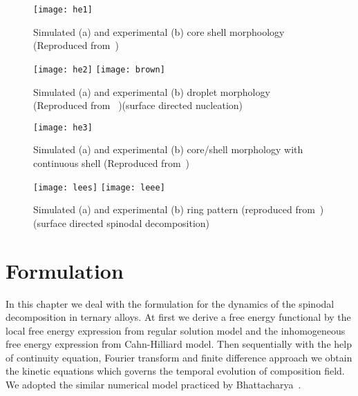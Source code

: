 \documentclass[12pt]{iiscthes}
\theoremstyle{definition}
\theoremstyle{definition}
\theoremstyle{remark}
\begin{document}
\begin{figure}[H]
\begin{center}
\texttt{[image: he1]}
\caption[Simulated (a) and experimental (b) core shell morphoology]{Simulated (a) and experimental (b) core shell morphoology (Reproduced from~\cite{RNauman})}\label{he1}
\end{center}
\end{figure}
\begin{figure}[H]
\begin{center}
\texttt{[image: he2]}
\texttt{[image: brown]}
\caption[Simulated (a) and experimental (b) droplet morphology]{Simulated (a) and experimental (b) droplet morphology (Reproduced from ~\cite{RNauman,Chakrabarti})(surface directed nucleation)}\label{he2}
\end{center}
\end{figure}
\begin{figure}[H]
\begin{center}
\texttt{[image: he3]}
\caption[Simulated (a) and experimental (b) core/shell morphology with continuous shell]{Simulated (a) and experimental (b) core/shell morphology with continuous shell (Reproduced from~\cite{RNauman})}\label{he2}
\end{center}
\end{figure}
\begin{figure}[H]
\begin{center}
\texttt{[image: lees]}
\texttt{[image: leee]}\\
\caption[Simulated (a) and experimental (b) ring pattern]{Simulated (a) and experimental (b) ring pattern (reproduced from~\cite{Lee})(surface directed spinodal decomposition)}\label{leese}
\end{center}
\end{figure}
\chapter{Formulation}
In this chapter we deal with the formulation for the dynamics of the spinodal decomposition in ternary alloys. At first we derive a free energy functional by the local free energy expression from regular solution model and the inhomogeneous free energy expression from Cahn-Hilliard model. Then sequentially with the help of continuity equation, Fourier transform and finite difference approach  we obtain the kinetic equations which governs the temporal evolution of composition field. We adopted the similar numerical model practiced by Bhattacharya~\cite{Bhattacharya}.
\end{document}
